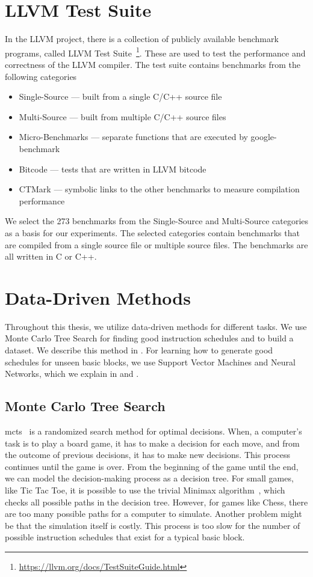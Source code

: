 \section{LLVM Test Suite}
\label{sec:bg:test-suite}
In the LLVM project, there is a collection of publicly available benchmark programs, called LLVM Test Suite~\footnote{\url{https://llvm.org/docs/TestSuiteGuide.html}}.
These are used to test the performance and correctness of the LLVM compiler.
The test suite contains benchmarks from the following categories
\begin{itemize}
    \item Single-Source --- built from a single C/C++ source file
    \item Multi-Source --- built from multiple C/C++ source files
    \item Micro-Benchmarks --- separate functions that are executed by google-benchmark
    \item Bitcode --- tests that are written in LLVM bitcode
    \item CTMark --- symbolic links to the other benchmarks to measure compilation performance
\end{itemize}
We select the 273 benchmarks from the Single-Source and Multi-Source categories as a basis for our experiments.
The selected categories contain benchmarks that are compiled from a single source file or multiple source files.
The benchmarks are all written in C or C++.


\section{Data-Driven Methods}
\label{sec:bg:ml}
Throughout this thesis, we utilize data-driven methods for different tasks.
We use Monte Carlo Tree Search for finding good instruction schedules and to build a dataset.
We describe this method in .
For learning how to generate good schedules for unseen basic blocks, we use Support Vector Machines and Neural Networks, which we explain in  and .

\subsection{Monte Carlo Tree Search}
\label{sec:bg:mcts}
\ac{mcts}~\cite{abramson1990expected} is a randomized search method for optimal decisions.
When, \eg a computer's task is to play a board game, it has to make a decision for each move, and from the outcome of previous decisions, it has to make new decisions.
This process continues until the game is over.
From the beginning of the game until the end, we can model the decision-making process as a decision tree.
For small games, like Tic Tac Toe, it is possible to use the trivial Minimax algorithm~\cite{neumann1928theorie}, which checks all possible paths in the decision tree.
However, for games like Chess, there are too many possible paths for a computer to simulate.
Another problem might be that the simulation itself is costly.
This process is too slow for the number of possible instruction schedules that exist for a typical basic block.


